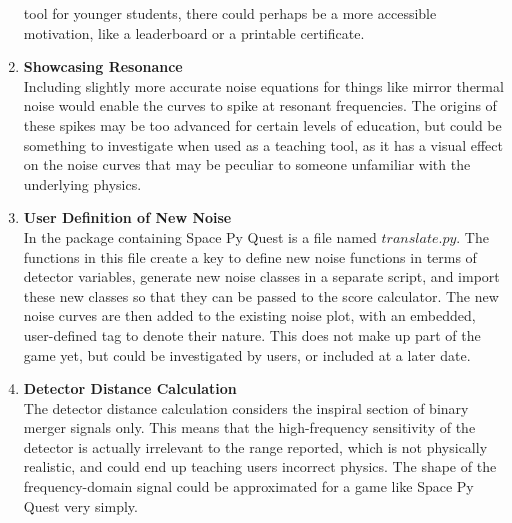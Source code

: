 \documentclass{article}
\begin{document}
\begin{enumerate}
    tool for younger students, there could perhaps be a more
    accessible motivation, like a leaderboard or a printable
    certificate.
\item \textbf{Showcasing Resonance} \\
Including slightly more accurate noise equations for things like
mirror thermal noise would enable the curves to spike at resonant
frequencies. The origins of these spikes may be  too advanced for
certain levels of education, but could be something to investigate
when used as a teaching tool, as it has a visual effect on the noise
curves that may be peculiar to someone unfamiliar with the underlying
physics.
        \item \textbf{User Definition of New Noise} \\
    In the package containing Space Py Quest is a file named
    $translate.py$. The functions in this file create a key to define
    new noise functions in terms of detector variables, generate new
    noise classes in a separate script, and import these new classes
    so that they can be passed to the score calculator. The new noise
    curves are then added to the existing noise plot, with an
    embedded, user-defined tag to denote their nature. This does not
    make up part of the game yet, but could be investigated by users,
    or included at a later date.
    \item \textbf{Detector Distance Calculation}\\
    The detector distance calculation considers the inspiral section
    of binary merger signals only. This means that the high-frequency
    sensitivity of the detector is actually irrelevant to the range
    reported, which is not physically realistic, and could end up
    teaching users incorrect physics. The shape of the
    frequency-domain signal could be approximated for a game like
    Space Py Quest very simply. 


\end{enumerate}
\end{document}
